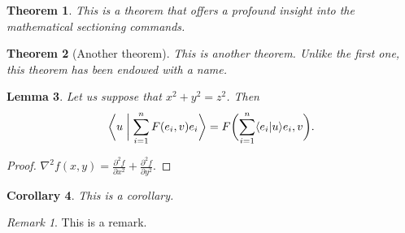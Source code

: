 \documentclass[
  digital, %
  oneside, %
  table,   %
  lof,     %
  lot,     %
]{fithesis3}
\begin{document}
\newtheorem{theorem}{Theorem}[section] %
\newtheorem{lemma}[theorem]{Lemma}         %
\newtheorem{corollary}[theorem]{Corollary} %
\theoremstyle{definition}
\newtheorem{definition}{Definition}
\theoremstyle{remark}
\newtheorem*{remark}{Remark}

\begin{theorem}
  This is a theorem that offers a profound insight into the
  mathematical sectioning commands.
\end{theorem}
\begin{theorem}[Another theorem]
  This is another theorem. Unlike the first one, this theorem has
  been endowed with a name.
\end{theorem}
\begin{lemma}
  Let us suppose that $x^2+y^2=z^2$. Then
  \begin{equation}
    \biggl\langle u\biggm|\sum_{i=1}^nF(e_i,v)e_i\biggr\rangle
    =F\biggl(\sum_{i=1}^n\langle e_i|u\rangle e_i,v\biggr).
  \end{equation}
\end{lemma}
\begin{proof}
  $\nabla^2 f(x,y)=\frac{\partial^2f}{\partial x^2}+
   \frac{\partial^2f}{\partial y^2}$.
\end{proof}
\begin{corollary}
  This is a corollary.
\end{corollary}
\begin{remark}
  This is a remark.
\end{remark}
\end{document}
